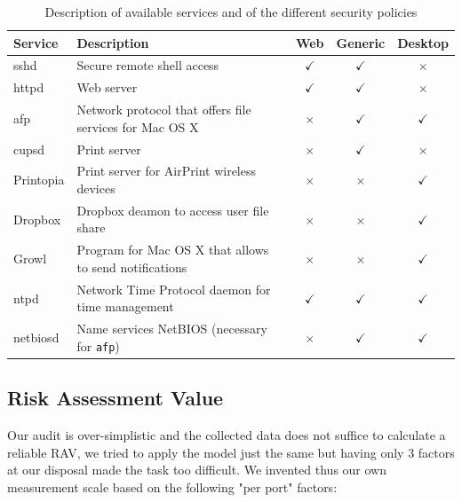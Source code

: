 \documentclass[10pt,a4paper,twoside,onecolumn]{article}
\begin{document}
\begin{table}
\begin{center}
\begin{threeparttable}[b]
\begin{tabularx}{\textwidth}{ l | X | c c c }

\toprule

Service & Description & Web & Generic & Desktop \\

\hline

sshd & Secure remote shell access & $\checkmark$ & $\checkmark$ & $\times$ \\
httpd & Web server & $\checkmark$ & $\checkmark$ & $\times$ \\
afp & Network protocol that offers file services for Mac OS X & $\times$ & $\checkmark$ & $\checkmark$\\
cupsd & Print server & $\times$ & $\checkmark$ & $\times$\\
Printopia & Print server for AirPrint wireless devices & $\times$ & $\times$ & $\checkmark$\\
Dropbox & Dropbox deamon to access user file share & $\times$ & $\times$ & $\checkmark$\\
Growl & Program for Mac OS X that allows to send notifications & $\times$ & $\times$ & $\checkmark$\\
ntpd & Network Time Protocol daemon for time management & $\checkmark$ & $\checkmark$ & $\checkmark$\\
netbiosd & Name services NetBIOS (necessary for \texttt{afp}) & $\times$ & $\checkmark$ & $\checkmark$\\

\bottomrule
\end{tabularx}

\caption{Description of available services and of the different security policies}
\label{tab:policies}
\end{threeparttable}
\end{center}
\end{table}

\subsection{Risk Assessment Value}
\label{sec:rav}

Our audit is over-simplistic and the collected data does not suffice to calculate a reliable RAV, we tried to apply the model just the same but having only 3 factors at our disposal made the task too difficult. We invented thus our own measurement scale based on the following "per port" factors:
\end{document}
